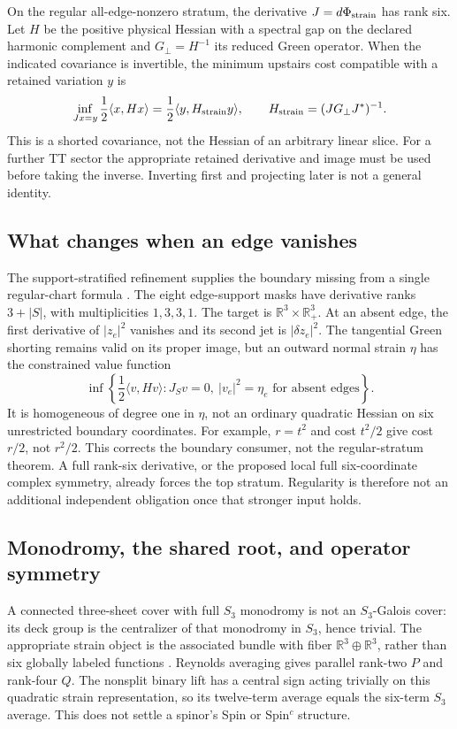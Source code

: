 \documentclass[11pt]{article}
\theoremstyle{definition}
\theoremstyle{remark}
\begin{document}
On the regular all-edge-nonzero stratum, the derivative
\(J=d\Phi_{\rm strain}\) has rank six. Let \(H\) be the positive physical
Hessian with a spectral gap on the declared harmonic complement and \(G_{\perp}=H^{-1}\) its
reduced Green operator. When the indicated covariance is invertible, the
minimum upstairs cost compatible with a retained variation \(y\) is
\[
\inf_{Jx=y}\frac12\langle x,Hx\rangle
=\frac12\langle y,H_{\rm strain}y\rangle,
\qquad H_{\rm strain}=(J G_{\perp}J^*)^{-1}.
\]
This is a shorted covariance, not the Hessian of an arbitrary linear slice.
For a further TT sector the appropriate retained derivative and image must
be used before taking the inverse. Inverting first and projecting later is
not a general identity.

\subsection{What changes when an edge vanishes}
\label{sec:support-strain}
The support-stratified refinement supplies the boundary missing from a
single regular-chart formula \cite{FrozenSupport}. The eight edge-support
masks have derivative ranks \(3+|S|\), with multiplicities \(1,3,3,1\).
The target is \(\mathbb R^3\times\mathbb R_+^3\). At an absent edge, the
first derivative of \(|z_e|^2\) vanishes and its second jet is
\(|\delta z_e|^2\). The tangential Green shorting remains valid on its
proper image, but an outward normal strain \(\eta\) has the constrained
value function
\[
\inf\left\{\frac12\langle v,Hv\rangle:
J_Sv=0,\ |v_e|^2=\eta_e\text{ for absent edges}\right\}.
\]
It is homogeneous of degree one in \(\eta\), not an ordinary quadratic
Hessian on six unrestricted boundary coordinates. For example,
\(r=t^2\) and cost \(t^2/2\) give cost \(r/2\), not \(r^2/2\).
This corrects the boundary consumer, not the regular-stratum theorem.
A full rank-six derivative, or the proposed local full six-coordinate
complex symmetry, already forces the top stratum. Regularity is therefore
not an additional independent obligation once that stronger input holds.

\subsection{Monodromy, the shared root, and operator symmetry}
\label{sec:monodromy-strain}
A connected three-sheet cover with full \(S_3\) monodromy is not an
\(S_3\)-Galois cover: its deck group is the centralizer of that monodromy
in \(S_3\), hence trivial. The appropriate strain object is the associated
bundle with fiber \(\mathbb R^3\oplus\mathbb R^3\), rather than six globally
labeled functions \cite{FrozenMonodromy}. Reynolds averaging gives parallel
rank-two \(P\) and rank-four \(Q\). The nonsplit binary lift has a central
sign acting trivially on this quadratic strain representation, so its
twelve-term average equals the six-term \(S_3\) average. This does not
settle a spinor's Spin or Spin\(^{c}\) structure.
\end{document}
